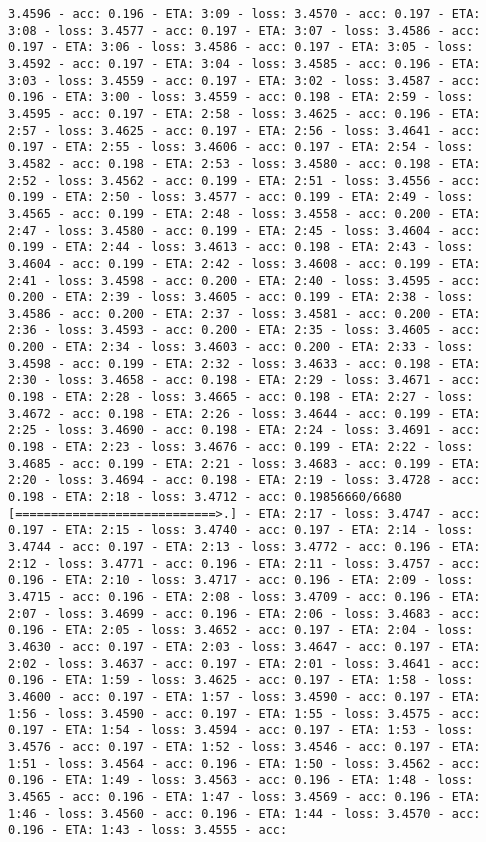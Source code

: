\documentclass[11pt]{article}
\begin{document}
\begin{Verbatim}[commandchars=\\\{\}]
3.4596 - acc: 0.196 - ETA: 3:09 - loss: 3.4570 - acc: 0.197 - ETA: 3:08 - loss: 3.4577 - acc: 0.197 - ETA: 3:07 - loss: 3.4586 - acc: 0.197 - ETA: 3:06 - loss: 3.4586 - acc: 0.197 - ETA: 3:05 - loss: 3.4592 - acc: 0.197 - ETA: 3:04 - loss: 3.4585 - acc: 0.196 - ETA: 3:03 - loss: 3.4559 - acc: 0.197 - ETA: 3:02 - loss: 3.4587 - acc: 0.196 - ETA: 3:00 - loss: 3.4559 - acc: 0.198 - ETA: 2:59 - loss: 3.4595 - acc: 0.197 - ETA: 2:58 - loss: 3.4625 - acc: 0.196 - ETA: 2:57 - loss: 3.4625 - acc: 0.197 - ETA: 2:56 - loss: 3.4641 - acc: 0.197 - ETA: 2:55 - loss: 3.4606 - acc: 0.197 - ETA: 2:54 - loss: 3.4582 - acc: 0.198 - ETA: 2:53 - loss: 3.4580 - acc: 0.198 - ETA: 2:52 - loss: 3.4562 - acc: 0.199 - ETA: 2:51 - loss: 3.4556 - acc: 0.199 - ETA: 2:50 - loss: 3.4577 - acc: 0.199 - ETA: 2:49 - loss: 3.4565 - acc: 0.199 - ETA: 2:48 - loss: 3.4558 - acc: 0.200 - ETA: 2:47 - loss: 3.4580 - acc: 0.199 - ETA: 2:45 - loss: 3.4604 - acc: 0.199 - ETA: 2:44 - loss: 3.4613 - acc: 0.198 - ETA: 2:43 - loss: 3.4604 - acc: 0.199 - ETA: 2:42 - loss: 3.4608 - acc: 0.199 - ETA: 2:41 - loss: 3.4598 - acc: 0.200 - ETA: 2:40 - loss: 3.4595 - acc: 0.200 - ETA: 2:39 - loss: 3.4605 - acc: 0.199 - ETA: 2:38 - loss: 3.4586 - acc: 0.200 - ETA: 2:37 - loss: 3.4581 - acc: 0.200 - ETA: 2:36 - loss: 3.4593 - acc: 0.200 - ETA: 2:35 - loss: 3.4605 - acc: 0.200 - ETA: 2:34 - loss: 3.4603 - acc: 0.200 - ETA: 2:33 - loss: 3.4598 - acc: 0.199 - ETA: 2:32 - loss: 3.4633 - acc: 0.198 - ETA: 2:30 - loss: 3.4658 - acc: 0.198 - ETA: 2:29 - loss: 3.4671 - acc: 0.198 - ETA: 2:28 - loss: 3.4665 - acc: 0.198 - ETA: 2:27 - loss: 3.4672 - acc: 0.198 - ETA: 2:26 - loss: 3.4644 - acc: 0.199 - ETA: 2:25 - loss: 3.4690 - acc: 0.198 - ETA: 2:24 - loss: 3.4691 - acc: 0.198 - ETA: 2:23 - loss: 3.4676 - acc: 0.199 - ETA: 2:22 - loss: 3.4685 - acc: 0.199 - ETA: 2:21 - loss: 3.4683 - acc: 0.199 - ETA: 2:20 - loss: 3.4694 - acc: 0.198 - ETA: 2:19 - loss: 3.4728 - acc: 0.198 - ETA: 2:18 - loss: 3.4712 - acc: 0.19856660/6680 [============================>.] - ETA: 2:17 - loss: 3.4747 - acc: 0.197 - ETA: 2:15 - loss: 3.4740 - acc: 0.197 - ETA: 2:14 - loss: 3.4744 - acc: 0.197 - ETA: 2:13 - loss: 3.4772 - acc: 0.196 - ETA: 2:12 - loss: 3.4771 - acc: 0.196 - ETA: 2:11 - loss: 3.4757 - acc: 0.196 - ETA: 2:10 - loss: 3.4717 - acc: 0.196 - ETA: 2:09 - loss: 3.4715 - acc: 0.196 - ETA: 2:08 - loss: 3.4709 - acc: 0.196 - ETA: 2:07 - loss: 3.4699 - acc: 0.196 - ETA: 2:06 - loss: 3.4683 - acc: 0.196 - ETA: 2:05 - loss: 3.4652 - acc: 0.197 - ETA: 2:04 - loss: 3.4630 - acc: 0.197 - ETA: 2:03 - loss: 3.4647 - acc: 0.197 - ETA: 2:02 - loss: 3.4637 - acc: 0.197 - ETA: 2:01 - loss: 3.4641 - acc: 0.196 - ETA: 1:59 - loss: 3.4625 - acc: 0.197 - ETA: 1:58 - loss: 3.4600 - acc: 0.197 - ETA: 1:57 - loss: 3.4590 - acc: 0.197 - ETA: 1:56 - loss: 3.4590 - acc: 0.197 - ETA: 1:55 - loss: 3.4575 - acc: 0.197 - ETA: 1:54 - loss: 3.4594 - acc: 0.197 - ETA: 1:53 - loss: 3.4576 - acc: 0.197 - ETA: 1:52 - loss: 3.4546 - acc: 0.197 - ETA: 1:51 - loss: 3.4564 - acc: 0.196 - ETA: 1:50 - loss: 3.4562 - acc: 0.196 - ETA: 1:49 - loss: 3.4563 - acc: 0.196 - ETA: 1:48 - loss: 3.4565 - acc: 0.196 - ETA: 1:47 - loss: 3.4569 - acc: 0.196 - ETA: 1:46 - loss: 3.4560 - acc: 0.196 - ETA: 1:44 - loss: 3.4570 - acc: 0.196 - ETA: 1:43 - loss: 3.4555 - acc: 
\end{Verbatim}
\end{document}
